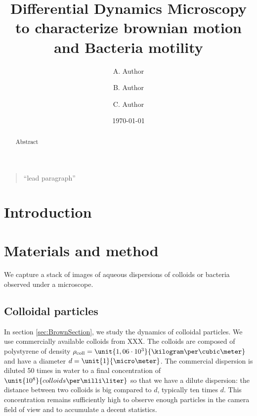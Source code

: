 \documentclass[%
 aip,
 jmp,%
 amsmath,amssymb,
reprint,%
]{revtex4-1}
\begin{document}

\title[Sample title]{Differential Dynamics Microscopy to characterize brownian motion and Bacteria motility}%

\author{A. Author}
\author{B. Author}%
%

\author{C. Author}
%

\date{\today}%

\begin{abstract}
Abstract
\end{abstract}

\maketitle

\begin{quotation}
``lead paragraph''
\end{quotation}

\section{\label{sec:level1}Introduction}



\section{Materials and method}

We capture a stack of images of aqueous dispersions of colloids or bacteria observed under a microscope.

\subsection{Colloidal particles}

In section \ref{sec:BrownSection}, we study the dynamics of colloidal particles. We use commercially available colloids from XXX. The colloids are composed of polystyrene of density $\rho_\text{coll} = \unit{1,06\cdot10^3}{\kilogram\per\cubic\meter}$ and have a diameter $d = \unit{1}{\micro\meter}$. The commercial dispersion is diluted 50 times in water to a final concentration of $\unit{10^8}{colloids\per\milli\liter}$ so that we have a dilute dispersion: the distance between two colloids is big compared to $d$, typically ten times $d$. This concentration remains sufficiently high to observe enough particles in the camera field of view and to accumulate a decent statistics.
\end{document}
